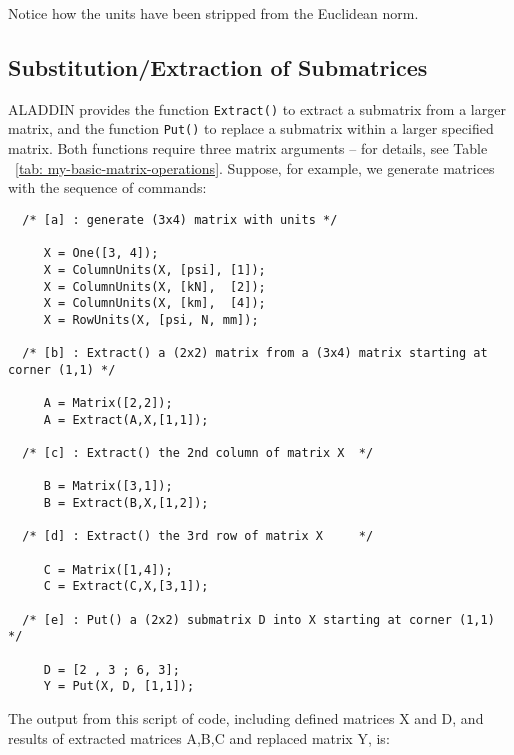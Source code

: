 \vspace{0.05 in}\noindent
Notice how the units have been stripped from the Euclidean norm.

\subsection{Substitution/Extraction of Submatrices}

\vspace{0.15 in}
\noindent\hspace{0.5 in}
ALADDIN provides the function {\tt Extract()} to
extract a submatrix from a larger matrix, and the function
{\tt Put()} to replace a submatrix within a larger specified matrix.
Both functions require three matrix arguments -- for details,
see Table ~\ref{tab: my-basic-matrix-operations}.
Suppose, for example, we generate matrices with the
sequence of commands:

\begin{footnotesize}
\begin{verbatim}
  /* [a] : generate (3x4) matrix with units */

     X = One([3, 4]);
     X = ColumnUnits(X, [psi], [1]);
     X = ColumnUnits(X, [kN],  [2]);
     X = ColumnUnits(X, [km],  [4]);
     X = RowUnits(X, [psi, N, mm]);

  /* [b] : Extract() a (2x2) matrix from a (3x4) matrix starting at corner (1,1) */

     A = Matrix([2,2]);
     A = Extract(A,X,[1,1]);

  /* [c] : Extract() the 2nd column of matrix X  */

     B = Matrix([3,1]);
     B = Extract(B,X,[1,2]);

  /* [d] : Extract() the 3rd row of matrix X     */

     C = Matrix([1,4]);
     C = Extract(C,X,[3,1]);

  /* [e] : Put() a (2x2) submatrix D into X starting at corner (1,1) */

     D = [2 , 3 ; 6, 3];
     Y = Put(X, D, [1,1]);
\end{verbatim}
\end{footnotesize}

\vspace{0.15 in}\noindent
The output from this script of code,
including defined matrices X and D,
and results of extracted matrices A,B,C and replaced matrix Y, is:

